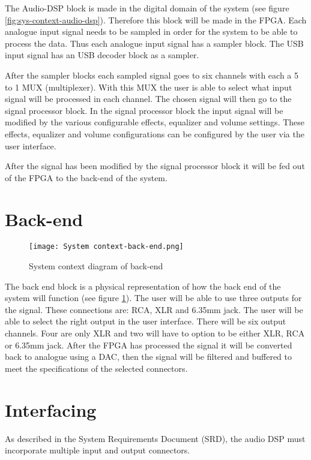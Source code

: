 The Audio-DSP block is made in the digital domain of the system (see figure \ref{fig:sys-context-audio-dsp}). Therefore this block will be made in the FPGA. Each analogue input signal needs to be sampled in order for the system to be able to process the data. Thus each analogue input signal has a sampler block. The USB input signal has an USB decoder block as a sampler. 

After the sampler blocks each sampled signal goes to six channels with each a 5 to 1 MUX (multiplexer). With this MUX the user is able to select what input signal will be processed in each channel. The chosen signal will then go to the signal processor block. In the signal processor block the input signal will be modified by the various configurable effects, equalizer and volume settings. These effects, equalizer and volume configurations can be configured by the user via the user interface.

After the signal has been modified by the signal processor block it will be fed out of the FPGA to the back-end of the system.

\section{Back-end}
\begin{figure}[ht]
    \texttt{[image: System context-back-end.png]}
    \caption{System context diagram of back-end}
    \label{fig:system-context-back-end}
\end{figure}

The back end block is a physical representation of how the back end of the system will function (see figure \ref{fig:system-context-back-end}). The user will be able to use three outputs for the signal. These connections are: RCA, XLR and 6.35mm jack. The user will be able to select the right output in the user interface. There will be six output channels. Four are only XLR and two will have to option to be either XLR, RCA or 6.35mm jack. After the FPGA has processed the signal it will be converted back to analogue using a DAC, then the signal will be filtered and buffered to meet the specifications of the selected connectors.

\section{Interfacing}

As described in the System Requirements Document (SRD), the audio DSP must incorporate multiple input and output connectors.

